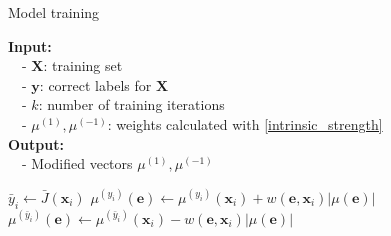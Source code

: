\documentclass[preprint,12pt]{elsarticle}
\theoremstyle{definition}
\begin{document}
\begin{algorithm}
  \caption{Model training}\label{training}
  \begin{flushleft}
  \textbf{Input:} \\
    ~~- $\mathbf X$: training set \hfill\\
    ~~- $\mathbf y$: correct labels for $\mathbf X$\\
    ~~- $k$: number of training iterations\\
    ~~- $\mu^{(1)}, \mu^{(-1)}$: weights calculated with \eqref{intrinsic_strength}\\
    \textbf{Output:} \\
    ~~- Modified vectors $\mu^{(1)}, \mu^{(-1)}$
  \end{flushleft}
  \begin{algorithmic}[1]
      
          \State $\bar y_i \gets \bar J(\mathbf x_i)$
              \State $\mu^{(y_i)}(\mathbf e) \gets \mu^{(y_i)}(\mathbf x_i) + w(\mathbf e,\mathbf x_i) |\mu(\mathbf e)|$
              \State $\mu^{(\bar y_i)}(\mathbf e) \gets \mu^{(\bar y_i)}(\mathbf x_i) - w(\mathbf e,\mathbf x_i) |\mu(\mathbf e)|$
            \EndFor
          \EndIf
        \EndFor
      \EndFor
  \end{algorithmic}
\end{algorithm}
\end{document}
